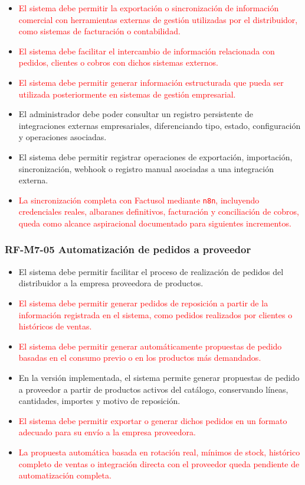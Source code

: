 \begin{itemize}
    \item \textcolor{red}{El sistema debe permitir la exportación o sincronización de información comercial con herramientas externas de gestión utilizadas por el distribuidor, como sistemas de facturación o contabilidad.}
    \item \textcolor{red}{El sistema debe facilitar el intercambio de información relacionada con pedidos, clientes o cobros con dichos sistemas externos.}
    \item \textcolor{red}{El sistema debe permitir generar información estructurada que pueda ser utilizada posteriormente en sistemas de gestión empresarial.}
    \item El administrador debe poder consultar un registro persistente de integraciones externas empresariales, diferenciando tipo, estado, configuración y operaciones asociadas.
    \item El sistema debe permitir registrar operaciones de exportación, importación, sincronización, webhook o registro manual asociadas a una integración externa.
    \item \textcolor{red}{La sincronización completa con Factusol mediante \texttt{n8n}, incluyendo credenciales reales, albaranes definitivos, facturación y conciliación de cobros, queda como alcance aspiracional documentado para siguientes incrementos.}
\end{itemize}

\vspace{-0.75em}
\subsubsection{RF-M7-05 Automatización de pedidos a proveedor}
\vspace{-1em}

\begin{itemize}
    \item El sistema debe permitir facilitar el proceso de realización de pedidos del distribuidor a la empresa proveedora de productos.
    \item \textcolor{red}{El sistema debe permitir generar pedidos de reposición a partir de la información registrada en el sistema, como pedidos realizados por clientes o históricos de ventas.}
    \item \textcolor{red}{El sistema debe permitir generar automáticamente propuestas de pedido basadas en el consumo previo o en los productos más demandados.}
    \item En la versión implementada, el sistema permite generar propuestas de pedido a proveedor a partir de productos activos del catálogo, conservando líneas, cantidades, importes y motivo de reposición.
    \item \textcolor{red}{El sistema debe permitir exportar o generar dichos pedidos en un formato adecuado para su envío a la empresa proveedora.}
    \item \textcolor{red}{La propuesta automática basada en rotación real, mínimos de stock, histórico completo de ventas o integración directa con el proveedor queda pendiente de automatización completa.}
\end{itemize}

